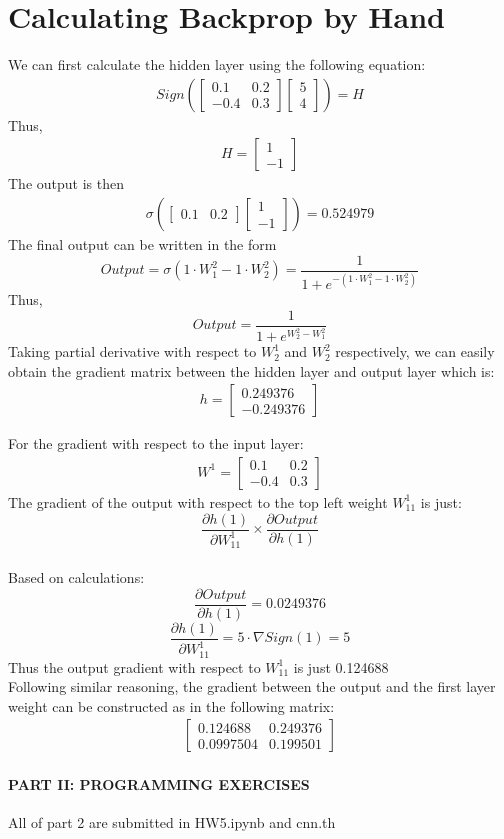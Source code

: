 \documentclass{article}
\begin{document}
\section{Calculating Backprop by Hand}
We can first calculate the hidden layer using the following equation:
\begin{align}
Sign(
\begin{bmatrix}
0.1 & 0.2 \\
-0.4 & 0.3
\end{bmatrix}
\begin{bmatrix}
5\\
4
\end{bmatrix}
)
=
H
\end{align}
Thus,
\begin{align}
H  = 
\begin{bmatrix}
1\\
-1
\end{bmatrix}
\end{align}
The output is then
\begin{align}
\sigma(
\begin{bmatrix}
0.1 & 0.2
\end{bmatrix}
\begin{bmatrix}
1\\
-1
\end{bmatrix}
) =0.524979
\end{align}
The final output can be written in the form
\[Output = \sigma(1\cdot W_{1}^{2}-1\cdot W_{2}^{2})=\frac{1}{1+e^{-(1\cdot W_{1}^{2}-1\cdot W_{2}^{2})}}\]
Thus,
\[Output = \frac{1}{1+e^{W_{2}^{2}-W_{1}^{2}}}\]
Taking partial derivative with respect to $W_{2}^{1}$ and $W_{2}^{2}$ respectively, we can easily obtain the gradient matrix between the hidden layer and output layer which is:
\begin{align}
h = 
\begin{bmatrix}
0.249376\\
-0.249376
\end{bmatrix}
\end{align}

For the gradient with respect to the input layer:
\begin{align}
W^{1} =
\begin{bmatrix}
0.1 & 0.2\\
-0.4 & 0.3
\end{bmatrix}
\end{align}
The gradient of the output with respect to the top left weight $W_{11}^{1}$ is just:
\[\frac{\partial{h(1)}}{\partial{W_{11}^{1}}} \times \frac{\partial{Output}}{\partial{h(1)}}\]
\\Based on calculations:
\[ \frac{\partial{Output}}{\partial{h(1)}} = 0.0249376 \]
\[\frac{\partial{h(1)}}{\partial{W_{11}^{1}}} = 5 \cdot \nabla Sign(1) = 5\]  
Thus the output gradient with respect to  $W_{11}^{1}$ is just 0.124688
\\Following similar reasoning, the gradient between the output and the first layer weight can be constructed as in the following matrix:
\begin{align}
\begin{bmatrix}
0.124688 & 0.249376\\
0.0997504 & 0.199501
\end{bmatrix}
\end{align}
    \paragraph{PART II: PROGRAMMING EXERCISES}
    
    All of part 2 are submitted  in HW5.ipynb and cnn.th
\end{document}
